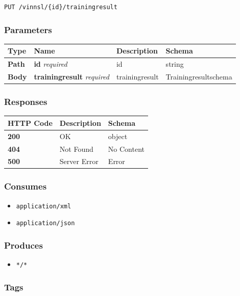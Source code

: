\begin{verbatim}
PUT /vinnsl/{id}/trainingresult
\end{verbatim}

\subsubsection{Parameters}\label{parameters-8}

\begin{longtable}[]{@{}llll@{}}
\toprule
Type & Name & Description & Schema\tabularnewline
\midrule
\endhead
\textbf{Path} & \textbf{id} \emph{required} & id & string\tabularnewline
\textbf{Body} & \textbf{trainingresult} \emph{required} & trainingresult
& Trainingresultschema\tabularnewline
\bottomrule
\end{longtable}

\subsubsection{Responses}\label{responses-9}

\begin{longtable}[]{@{}lll@{}}
\toprule
HTTP Code & Description & Schema\tabularnewline
\midrule
\endhead
\textbf{200} & OK & object\tabularnewline
\textbf{404} & Not Found & No Content\tabularnewline
\textbf{500} & Server Error & Error\tabularnewline
\bottomrule
\end{longtable}

\subsubsection{Consumes}\label{consumes-5}

\begin{itemize}
\tightlist
\item
  \texttt{application/xml}
\item
  \texttt{application/json}
\end{itemize}

\subsubsection{Produces}\label{produces-9}

\begin{itemize}
\tightlist
\item
  \texttt{*/*}
\end{itemize}

\subsubsection{Tags}\label{tags-9}

